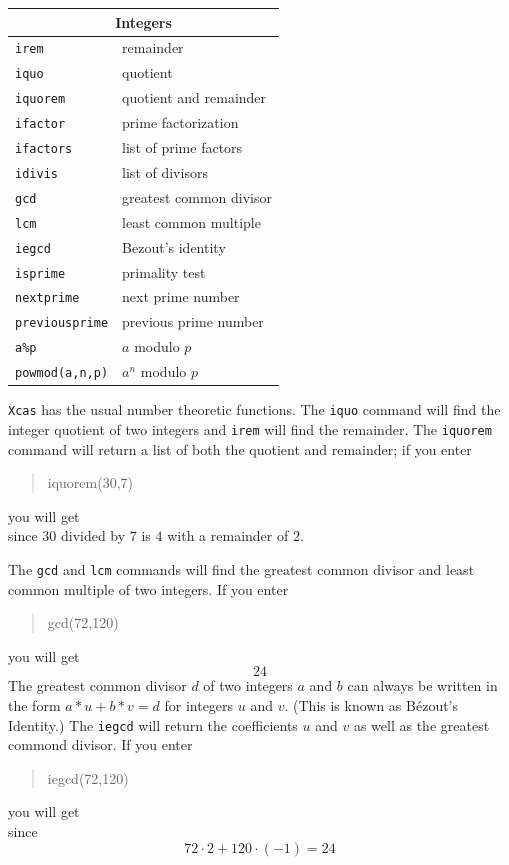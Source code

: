 \documentclass{article}
\newcommand{\xcasin}[1]
{\begin{quote}\ttfamily
#1
\end{quote}}
\newcommand{\xcasout}[1]
{\begin{equation*}
#1
\end{equation*}}
\begin{document}
\begin{center}
\begin{tabular}{|p{}|p{}|}
\hline
\multicolumn{2}{|c|}{\textbf{Integers}}\\
\hline\hline
\texttt{irem} & remainder\\
\texttt{iquo} & quotient\\
\texttt{iquorem} & quotient and remainder\\
\hline
\texttt{ifactor} & prime factorization\\
\texttt{ifactors} & list of prime factors\\
\texttt{idivis} & list of divisors\\
\hline
\texttt{gcd} & greatest common divisor\\
\texttt{lcm} & least common multiple\\
\texttt{iegcd} & Bezout's identity\\
\hline
\texttt{isprime} & primality test\\
\texttt{nextprime} & next prime number\\
\texttt{previousprime} & previous prime number\\
\hline
\texttt{a\%p} & $a$ modulo $p$\\
\texttt{powmod(a,n,p)} & $a^n$ modulo $p$\\
\hline
\end{tabular}
\end{center}

\texttt{Xcas} has the usual number theoretic functions.  The
\texttt{iquo} command will find the integer quotient of two integers
and \texttt{irem} will find the remainder.  The \texttt{iquorem}
command will return a list of both the quotient and remainder; if you
enter
\xcasin{iquorem(30,7)}
you will get
\xcasout{[4,2]}
since $30$ divided by $7$ is $4$ with a remainder of $2$.

The \texttt{gcd} and \texttt{lcm} commands will find the greatest
common divisor and least common multiple of two integers.  If you enter
\xcasin{gcd(72,120)}
you will get
\xcasout{24}
The greatest common divisor $d$ of two integers $a$ and $b$ can always be
written in the form $a*u + b*v = d$ for integers $u$ and $v$.  (This
is known as B\'ezout's Identity.)  The \texttt{iegcd} will
return the coefficients $u$ and $v$ as well as the greatest commond
divisor.  If you enter
\xcasin{iegcd(72,120)}
you will get
\xcasout{[2,-1,24]}
since
\[ 72\cdot 2 + 120\cdot(-1) = 24\]
\end{document}
